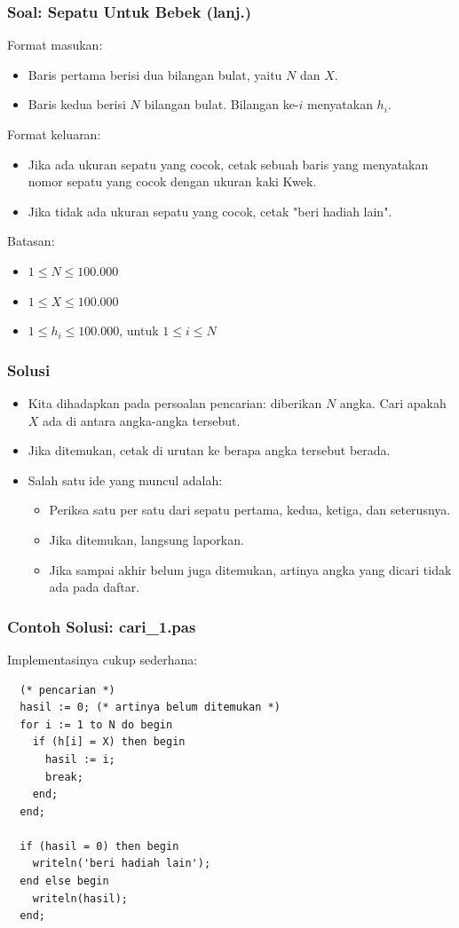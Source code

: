 \begin{frame}
\frametitle{Soal: Sepatu Untuk Bebek (lanj.)}
Format masukan:
\begin{itemize}
  \item Baris pertama berisi dua bilangan bulat, yaitu $N$ dan $X$.
  \item Baris kedua berisi $N$ bilangan bulat. Bilangan ke-$i$ menyatakan $h_i$.
\end{itemize}
Format keluaran:
\begin{itemize}
  \item Jika ada ukuran sepatu yang cocok, cetak sebuah baris yang menyatakan nomor sepatu yang cocok dengan ukuran kaki Kwek.
  \item Jika tidak ada ukuran sepatu yang cocok, cetak "beri hadiah lain".
\end{itemize}
Batasan:
\begin{itemize}
  \item $1 \le N \le 100.000$
  \item $1 \le X \le 100.000$
  \item $1 \le h_i \le 100.000$, untuk $1 \le i \le N$
\end{itemize}
\end{frame}

\begin{frame}
\frametitle{Solusi}
\begin{itemize}
  \item Kita dihadapkan pada persoalan pencarian: diberikan $N$ angka. Cari apakah $X$ ada di antara angka-angka tersebut.
  \item Jika ditemukan, cetak di urutan ke berapa angka tersebut berada.
  \item Salah satu ide yang muncul adalah:
  \begin{itemize}
    \item Periksa satu per satu dari sepatu pertama, kedua, ketiga, dan seterusnya.
    \item Jika ditemukan, langsung laporkan.
    \item Jika sampai akhir belum juga ditemukan, artinya angka yang dicari tidak ada pada daftar.
  \end{itemize}
\end{itemize}
\end{frame}

\begin{frame}[fragile]
\frametitle{Contoh Solusi: cari\_1.pas}
Implementasinya cukup sederhana:
\begin{lstlisting}
  (* pencarian *)
  hasil := 0; (* artinya belum ditemukan *)
  for i := 1 to N do begin
    if (h[i] = X) then begin
      hasil := i;
      break;
    end;
  end;

  if (hasil = 0) then begin
    writeln('beri hadiah lain');
  end else begin
    writeln(hasil);
  end;
\end{lstlisting}
\end{frame}

